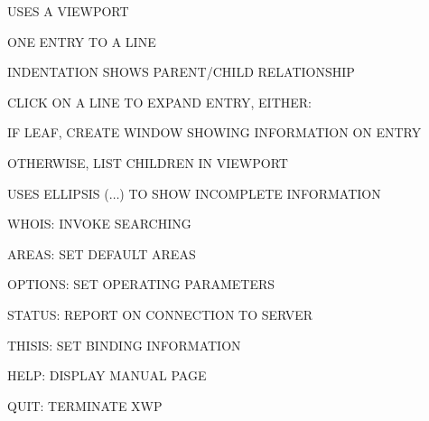 \begin{bwslide}

\end{bwslide}


\begin{bwslide}

\begin{nrtc}
\item	USES A VIEWPORT
    \begin{nrtc}
    \item	ONE ENTRY TO A LINE

    \item	INDENTATION SHOWS PARENT/CHILD RELATIONSHIP
    \end{nrtc}

\item	CLICK ON A LINE TO EXPAND ENTRY, EITHER:
    \begin{nrtc}
    \item	IF LEAF, CREATE WINDOW SHOWING INFORMATION ON ENTRY

    \item	OTHERWISE, LIST CHILDREN IN VIEWPORT
    \end{nrtc}

\item	USES ELLIPSIS ($\ldots$) TO SHOW INCOMPLETE INFORMATION
\end{nrtc}
\end{bwslide}




\begin{bwslide}

\begin{nrtc}
\item	WHOIS: INVOKE SEARCHING

\item	AREAS: SET DEFAULT AREAS

\item	OPTIONS: SET OPERATING PARAMETERS

\item	STATUS: REPORT ON CONNECTION TO SERVER

\item	THISIS: SET BINDING INFORMATION

\item	HELP: DISPLAY MANUAL PAGE

\item	QUIT: TERMINATE XWP
\end{nrtc}
\end{bwslide}


